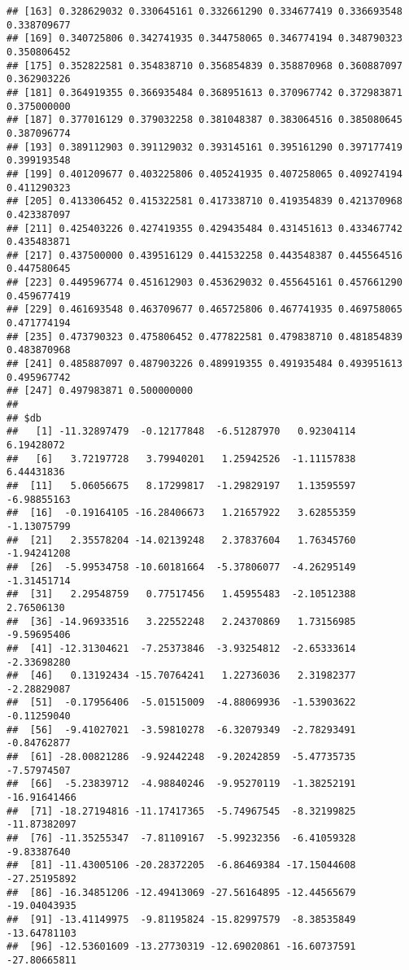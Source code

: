 \documentclass[
]{article}
\begin{document}
\begin{verbatim}
## [163] 0.328629032 0.330645161 0.332661290 0.334677419 0.336693548 0.338709677
## [169] 0.340725806 0.342741935 0.344758065 0.346774194 0.348790323 0.350806452
## [175] 0.352822581 0.354838710 0.356854839 0.358870968 0.360887097 0.362903226
## [181] 0.364919355 0.366935484 0.368951613 0.370967742 0.372983871 0.375000000
## [187] 0.377016129 0.379032258 0.381048387 0.383064516 0.385080645 0.387096774
## [193] 0.389112903 0.391129032 0.393145161 0.395161290 0.397177419 0.399193548
## [199] 0.401209677 0.403225806 0.405241935 0.407258065 0.409274194 0.411290323
## [205] 0.413306452 0.415322581 0.417338710 0.419354839 0.421370968 0.423387097
## [211] 0.425403226 0.427419355 0.429435484 0.431451613 0.433467742 0.435483871
## [217] 0.437500000 0.439516129 0.441532258 0.443548387 0.445564516 0.447580645
## [223] 0.449596774 0.451612903 0.453629032 0.455645161 0.457661290 0.459677419
## [229] 0.461693548 0.463709677 0.465725806 0.467741935 0.469758065 0.471774194
## [235] 0.473790323 0.475806452 0.477822581 0.479838710 0.481854839 0.483870968
## [241] 0.485887097 0.487903226 0.489919355 0.491935484 0.493951613 0.495967742
## [247] 0.497983871 0.500000000
## 
## $db
##   [1] -11.32897479  -0.12177848  -6.51287970   0.92304114   6.19428072
##   [6]   3.72197728   3.79940201   1.25942526  -1.11157838   6.44431836
##  [11]   5.06056675   8.17299817  -1.29829197   1.13595597  -6.98855163
##  [16]  -0.19164105 -16.28406673   1.21657922   3.62855359  -1.13075799
##  [21]   2.35578204 -14.02139248   2.37837604   1.76345760  -1.94241208
##  [26]  -5.99534758 -10.60181664  -5.37806077  -4.26295149  -1.31451714
##  [31]   2.29548759   0.77517456   1.45955483  -2.10512388   2.76506130
##  [36] -14.96933516   3.22552248   2.24370869   1.73156985  -9.59695406
##  [41] -12.31304621  -7.25373846  -3.93254812  -2.65333614  -2.33698280
##  [46]   0.13192434 -15.70764241   1.22736036   2.31982377  -2.28829087
##  [51]  -0.17956406  -5.01515009  -4.88069936  -1.53903622  -0.11259040
##  [56]  -9.41027021  -3.59810278  -6.32079349  -2.78293491  -0.84762877
##  [61] -28.00821286  -9.92442248  -9.20242859  -5.47735735  -7.57974507
##  [66]  -5.23839712  -4.98840246  -9.95270119  -1.38252191 -16.91641466
##  [71] -18.27194816 -11.17417365  -5.74967545  -8.32199825 -11.87382097
##  [76] -11.35255347  -7.81109167  -5.99232356  -6.41059328  -9.83387640
##  [81] -11.43005106 -20.28372205  -6.86469384 -17.15044608 -27.25195892
##  [86] -16.34851206 -12.49413069 -27.56164895 -12.44565679 -19.04043935
##  [91] -13.41149975  -9.81195824 -15.82997579  -8.38535849 -13.64781103
##  [96] -12.53601609 -13.27730319 -12.69020861 -16.60737591 -27.80665811

\end{verbatim}
\end{document}
